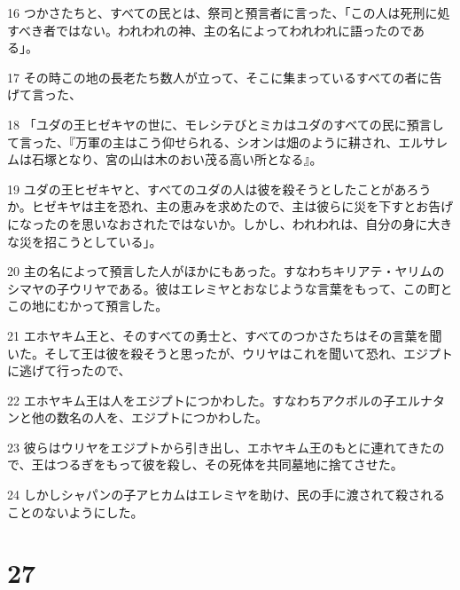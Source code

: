 \par 16 つかさたちと、すべての民とは、祭司と預言者に言った、「この人は死刑に処すべき者ではない。われわれの神、主の名によってわれわれに語ったのである」。
\par 17 その時この地の長老たち数人が立って、そこに集まっているすべての者に告げて言った、
\par 18 「ユダの王ヒゼキヤの世に、モレシテびとミカはユダのすべての民に預言して言った、『万軍の主はこう仰せられる、シオンは畑のように耕され、エルサレムは石塚となり、宮の山は木のおい茂る高い所となる』。
\par 19 ユダの王ヒゼキヤと、すべてのユダの人は彼を殺そうとしたことがあろうか。ヒゼキヤは主を恐れ、主の恵みを求めたので、主は彼らに災を下すとお告げになったのを思いなおされたではないか。しかし、われわれは、自分の身に大きな災を招こうとしている」。
\par 20 主の名によって預言した人がほかにもあった。すなわちキリアテ・ヤリムのシマヤの子ウリヤである。彼はエレミヤとおなじような言葉をもって、この町とこの地にむかって預言した。
\par 21 エホヤキム王と、そのすべての勇士と、すべてのつかさたちはその言葉を聞いた。そして王は彼を殺そうと思ったが、ウリヤはこれを聞いて恐れ、エジプトに逃げて行ったので、
\par 22 エホヤキム王は人をエジプトにつかわした。すなわちアクボルの子エルナタンと他の数名の人を、エジプトにつかわした。
\par 23 彼らはウリヤをエジプトから引き出し、エホヤキム王のもとに連れてきたので、王はつるぎをもって彼を殺し、その死体を共同墓地に捨てさせた。
\par 24 しかしシャパンの子アヒカムはエレミヤを助け、民の手に渡されて殺されることのないようにした。

\chapter{27}

